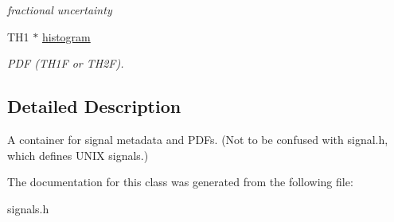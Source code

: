 \begin{DoxyCompactItemize}
\begin{DoxyCompactList}\small\item\em fractional uncertainty \item\end{DoxyCompactList}\item 
\hypertarget{structSignal_a0fb6b6acb6d4224105f776925da00747}{
TH1 $\ast$ \hyperlink{structSignal_a0fb6b6acb6d4224105f776925da00747}{histogram}}
\label{structSignal_a0fb6b6acb6d4224105f776925da00747}

\begin{DoxyCompactList}\small\item\em PDF (TH1F or TH2F). \item\end{DoxyCompactList}\end{DoxyCompactItemize}


\subsection{Detailed Description}
A container for signal metadata and PDFs. (Not to be confused with signal.h, which defines UNIX signals.) 

The documentation for this class was generated from the following file:\begin{DoxyCompactItemize}
\item 
signals.h\end{DoxyCompactItemize}
